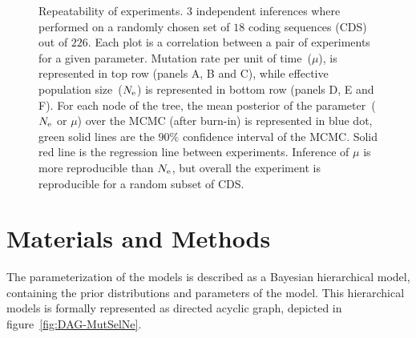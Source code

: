 \begin{figure}[htbp]
    \caption[Repeatability of experiments]{
    Repeatability of experiments.
    $3$ independent inferences where performed on a randomly chosen set of $18$ coding sequences (CDS) out of $226$.
    Each plot is a correlation between a pair of experiments for a given parameter.
    Mutation rate per unit of time~($\mu$), is represented in top row (panels A, B and C), while effective population size~($N_{\mathrm{e}}$) is represented in bottom row (panels D, E and F).
    For each node of the tree, the mean posterior of the parameter~($N_{\mathrm{e}}$ or $\mu$) over the \acrshort{MCMC} (after burn-in) is represented in blue dot, green solid lines are the $90\%$ confidence interval of the \acrshort{MCMC}.
    Solid red line is the regression line between experiments.
    Inference of $\mu$ is more reproducible than $N_{\mathrm{e}}$, but overall the experiment is reproducible for a random subset of CDS.
    }
    \label{fig:mammals_repeatability}
\end{figure}


\section{Materials and Methods}
\label{sec:MatMet}
The parameterization of the models is described as a Bayesian hierarchical model, containing the prior distributions and parameters of the model.
This hierarchical models is formally represented as directed acyclic graph, depicted in figure~\ref{fig:DAG-MutSelNe}.

